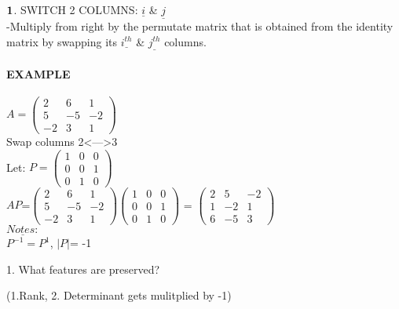 \documentclass[]{article}
\let\oldparagraph\paragraph
\renewcommand{\paragraph}[1]{\oldparagraph{#1}\mbox{}}
\begin{document}
\(\bold{1}\). SWITCH 2 COLUMNS: \(\underline{i}\) \& \(\underline{j}\)\\
 -Multiply from right by the permutate matrix that is obtained from the
identity matrix by swapping its \(\underline{i^{th}}\) \&
\(\underline{j^{th}}\) columns.\\

\paragraph{\texorpdfstring{EXAMPLE\\
}{EXAMPLE }}\label{example-8}

\(A =\begin{pmatrix} 2 & 6 & 1\\ 5 & -5 & -2 \\ -2 & 3 & 1 \end{pmatrix}\)\\

Swap columns 2\textless{}---\textgreater{}3\\

Let:
\(P =\begin{pmatrix} 1 & 0 & 0\\ 0 & 0 & 1 \\ 0 & 1 & 0 \end{pmatrix}\)\\

\(AP\)=\(\begin{pmatrix} 2 & 6 & 1\\ 5 & -5 & -2 \\ -2 & 3 & 1 \end{pmatrix}\begin{pmatrix} 1 & 0 & 0\\ 0 & 0 & 1 \\ 0 & 1 & 0 \end{pmatrix}\)
=
\(\begin{pmatrix} 2 & 5 & -2\\ 1 & -2 & 1 \\ 6 & -5 & 3 \end{pmatrix}\)\\

\(\underline{Notes:}\)\\

\(P^{-1}=P^{1}\), \(|P|\)= -1\\

\begin{tcolorbox}[colback=yellow!5,colframe=yellow!40!black,title=Question]
1. What features are preserved?

(1.Rank, 2. Determinant gets mulitplied by -1)

\end{tcolorbox}
\end{document}
